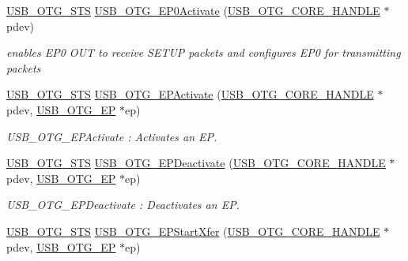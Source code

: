 \begin{DoxyCompactItemize}
\hyperlink{group___u_s_b___c_o_r_e___exported___types_ga8b6504b9af0662f17515795db0f9c8ed}{U\-S\-B\-\_\-\-O\-T\-G\-\_\-\-S\-T\-S} \hyperlink{group___u_s_b___c_o_r_e___exported___functions_prototype_ga0fabcd7b811a835080871cb9cc18fd5a}{U\-S\-B\-\_\-\-O\-T\-G\-\_\-\-E\-P0\-Activate} (\hyperlink{group___u_s_b___c_o_r_e___exported___types_gaf76054c11eb8a3367907aad7ae700e80}{U\-S\-B\-\_\-\-O\-T\-G\-\_\-\-C\-O\-R\-E\-\_\-\-H\-A\-N\-D\-L\-E} $\ast$pdev)
\begin{DoxyCompactList}\small\item\em enables E\-P0 O\-U\-T to receive S\-E\-T\-U\-P packets and configures E\-P0 for transmitting packets \end{DoxyCompactList}\item 
\hyperlink{group___u_s_b___c_o_r_e___exported___types_ga8b6504b9af0662f17515795db0f9c8ed}{U\-S\-B\-\_\-\-O\-T\-G\-\_\-\-S\-T\-S} \hyperlink{group___u_s_b___c_o_r_e___exported___functions_prototype_ga3506fb02d0b74d2d42be8ddc67f1fddf}{U\-S\-B\-\_\-\-O\-T\-G\-\_\-\-E\-P\-Activate} (\hyperlink{group___u_s_b___c_o_r_e___exported___types_gaf76054c11eb8a3367907aad7ae700e80}{U\-S\-B\-\_\-\-O\-T\-G\-\_\-\-C\-O\-R\-E\-\_\-\-H\-A\-N\-D\-L\-E} $\ast$pdev, \hyperlink{group___u_s_b___c_o_r_e___exported___types_gad1c65925021e8dac88858e10bb2a7eea}{U\-S\-B\-\_\-\-O\-T\-G\-\_\-\-E\-P} $\ast$ep)
\begin{DoxyCompactList}\small\item\em U\-S\-B\-\_\-\-O\-T\-G\-\_\-\-E\-P\-Activate \-: Activates an E\-P. \end{DoxyCompactList}\item 
\hyperlink{group___u_s_b___c_o_r_e___exported___types_ga8b6504b9af0662f17515795db0f9c8ed}{U\-S\-B\-\_\-\-O\-T\-G\-\_\-\-S\-T\-S} \hyperlink{group___u_s_b___c_o_r_e___exported___functions_prototype_gad8d304905c8dba28a3363c83024db018}{U\-S\-B\-\_\-\-O\-T\-G\-\_\-\-E\-P\-Deactivate} (\hyperlink{group___u_s_b___c_o_r_e___exported___types_gaf76054c11eb8a3367907aad7ae700e80}{U\-S\-B\-\_\-\-O\-T\-G\-\_\-\-C\-O\-R\-E\-\_\-\-H\-A\-N\-D\-L\-E} $\ast$pdev, \hyperlink{group___u_s_b___c_o_r_e___exported___types_gad1c65925021e8dac88858e10bb2a7eea}{U\-S\-B\-\_\-\-O\-T\-G\-\_\-\-E\-P} $\ast$ep)
\begin{DoxyCompactList}\small\item\em U\-S\-B\-\_\-\-O\-T\-G\-\_\-\-E\-P\-Deactivate \-: Deactivates an E\-P. \end{DoxyCompactList}\item 
\hyperlink{group___u_s_b___c_o_r_e___exported___types_ga8b6504b9af0662f17515795db0f9c8ed}{U\-S\-B\-\_\-\-O\-T\-G\-\_\-\-S\-T\-S} \hyperlink{group___u_s_b___c_o_r_e___exported___functions_prototype_gab401b82677e559a8cfe12c30539e66ca}{U\-S\-B\-\_\-\-O\-T\-G\-\_\-\-E\-P\-Start\-Xfer} (\hyperlink{group___u_s_b___c_o_r_e___exported___types_gaf76054c11eb8a3367907aad7ae700e80}{U\-S\-B\-\_\-\-O\-T\-G\-\_\-\-C\-O\-R\-E\-\_\-\-H\-A\-N\-D\-L\-E} $\ast$pdev, \hyperlink{group___u_s_b___c_o_r_e___exported___types_gad1c65925021e8dac88858e10bb2a7eea}{U\-S\-B\-\_\-\-O\-T\-G\-\_\-\-E\-P} $\ast$ep)

\end{DoxyCompactItemize}
